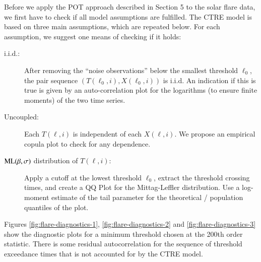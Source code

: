 \documentclass[]{elsarticle} %
\begin{document}
Before we apply the POT approach described in Section 5 to the solar
flare data, we first have to check if all model assumptions are
fulfilled. The CTRE model is based on three main assumptions, which are
repeated below. For each assumption, we suggest one means of checking if
it holds:

\begin{description}
\item[i.i.d.:]
After removing the ``noise observations'' below the smallest threshold
\(\ell_0\), the pair sequence \((T(\ell_0, i), X(\ell_0,i))\) is i.i.d.
An indication if this is true is given by an auto-correlation plot for
the logarithms (to ensure finite moments) of the two time series.
\item[Uncoupled:]
Each \(T(\ell, i)\) is independent of each \(X(\ell, i)\). We propose an
empirical copula plot to check for any dependence.
\item[\({\rm ML}(\beta, \sigma)\) distribution of \(T(\ell, i)\):]
Apply a cutoff at the lowest threshold \(\ell_0\), extract the threshold
crossing times, and create a QQ Plot for the Mittag-Leffler
distribution. Use a log-moment estimate of the tail parameter for the
theoretical / population quantiles of the plot.
\end{description}

Figures \ref{fig:flare-diagnostics-1}, \ref{fig:flare-diagnostics-2} and
\ref{fig:flare-diagnostics-3} show the diagnostic plots for a minimum
threshold chosen at the 200th order statistic. There is some residual
autocorrelation for the sequence of threshold exceedance times that is
not accounted for by the CTRE model.
\end{document}
